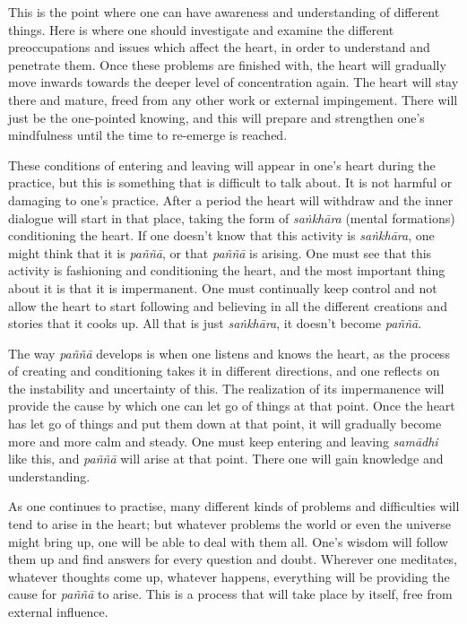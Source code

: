 This is the point where one can have awareness and understanding of
different things. Here is where one should investigate and examine the
different preoccupations and issues which affect the heart, in order to
understand and penetrate them. Once these problems are finished with, 
the heart will gradually move inwards towards the deeper level of
concentration again. The heart will stay there and mature, freed from
any other work or external impingement. There will just be the
one-pointed knowing, and this will prepare and strengthen one's
mindfulness until the time to re-emerge is reached. 

These conditions of entering and leaving will appear in one's heart
during the practice, but this is something that is difficult to talk
about. It is not harmful or damaging to one's practice. After a period
the heart will withdraw and the inner dialogue will start in that place, 
taking the form of \emph{saṅkhāra} (mental formations) conditioning the
heart. If one doesn't know that this activity is \emph{saṅkhāra}, one
might think that it is \emph{paññā}, or that \emph{paññā} is arising. 
One must see that this activity is fashioning and conditioning the
heart, and the most important thing about it is that it is impermanent. 
One must continually keep control and not allow the heart to start
following and believing in all the different creations and stories that
it cooks up. All that is just \emph{saṅkhāra}, it doesn't become
\emph{paññā}. 

The way \emph{paññā} develops is when one listens and knows the heart, 
as the process of creating and conditioning takes it in different
directions, and one reflects on the instability and uncertainty of this. 
The realization of its impermanence will provide the cause by which one
can let go of things at that point. Once the heart has let go of things
and put them down at that point, it will gradually become more and more
calm and steady. One must keep entering and leaving \emph{samādhi} like
this, and \emph{paññā} will arise at that point. There one will gain
knowledge and understanding. 

As one continues to practise, many different kinds of problems and
difficulties will tend to arise in the heart; but whatever problems the
world or even the universe might bring up, one will be able to deal with
them all. One's wisdom will follow them up and find answers for every
question and doubt. Wherever one meditates, whatever thoughts come up, 
whatever happens, everything will be providing the cause for
\emph{paññā} to arise. This is a process that will take place by itself, 
free from external influence.

